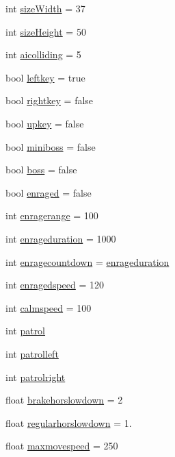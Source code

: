 \begin{DoxyCompactItemize}
\item 
int \hyperlink{classAI_afff2954d66c370ee45640977182f5e41}{size\+Width} = 37
\item 
int \hyperlink{classAI_a85fd1bdecd52faf9017230708c558276}{size\+Height} = 50
\item 
int \hyperlink{classAI_a17f6d2ecc23b43a425623947b639656d}{aicolliding} = 5
\item 
bool \hyperlink{classAI_af4a6576f510ed03a56c98bfc5b711f1a}{leftkey} = true
\item 
bool \hyperlink{classAI_afd8bf97dd365a456af724aade73129fb}{rightkey} = false
\item 
bool \hyperlink{classAI_a1bde8ebcfb666d83ffb7e71993bf06fc}{upkey} = false
\item 
bool \hyperlink{classAI_aee02bf098d14d402140bdeb9516280f9}{miniboss} = false
\item 
bool \hyperlink{classAI_a1fa0702b9e1c4b6a29227dfc6e58be46}{boss} = false
\item 
bool \hyperlink{classAI_a0b809846d43813799b3e44c42114e9a1}{enraged} = false
\item 
int \hyperlink{classAI_a768ddc6536a7b929c44f5deb643c60bc}{enragerange} = 100
\item 
int \hyperlink{classAI_a2e89055bd6a91949269c76ec94017194}{enrageduration} = 1000
\item 
int \hyperlink{classAI_a155447249032f20011edefe8be3d081d}{enragecountdown} = \hyperlink{classAI_a2e89055bd6a91949269c76ec94017194}{enrageduration}
\item 
int \hyperlink{classAI_af6b753eddb25c163d5b359420b314d4e}{enragedspeed} = 120
\item 
int \hyperlink{classAI_abdd48a54d265d83866f11fbe2ad8eed0}{calmspeed} = 100
\item 
int \hyperlink{classAI_ac28e1dce23ebfb9beb0542ddd46ec3da}{patrol}
\item 
int \hyperlink{classAI_a8a572d9fa33e579a4c8eea9e1ab09e8f}{patrolleft}
\item 
int \hyperlink{classAI_a5af0047dcf09f37b7f2feb8d2b078ce8}{patrolright}
\item 
float \hyperlink{classAI_ad7d82b191fab3c529f0f8c60b0e71ab2}{brakehorslowdown} = 2
\item 
float \hyperlink{classAI_a021f46f3eb1d76607a5a22bdcd296d11}{regularhorslowdown} = 1.
\item 
float \hyperlink{classAI_a3af9cf8b86fff09d7e95ed913636e18a}{maxmovespeed} = 250

\end{DoxyCompactItemize}

